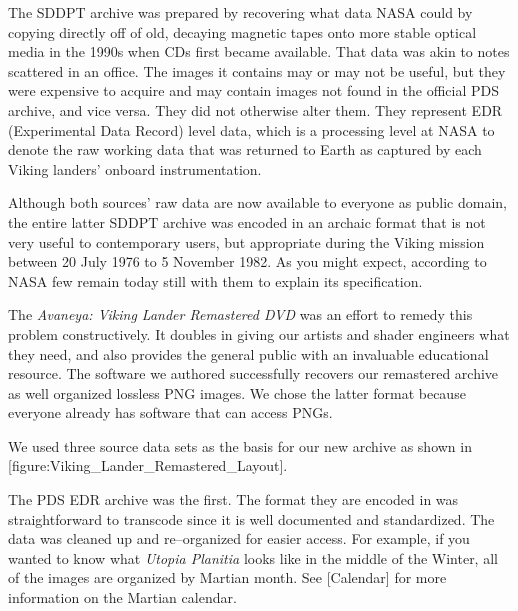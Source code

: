 The SDDPT archive was prepared by recovering what data NASA could by copying directly off of old, decaying magnetic tapes onto more stable optical media in the 1990s when CDs first became available. That data was  akin to notes scattered in an office. The images it contains may or may not be useful, but they were expensive to acquire and may contain images not found in the official PDS archive, and vice versa. They did not otherwise alter them. They represent EDR (Experimental Data Record) level data, which is a processing level at NASA to denote the raw working data that was returned to Earth as captured by each Viking landers' onboard instrumentation.

Although both sources' raw data are now available to everyone as public domain, the entire latter SDDPT archive was encoded in an archaic format that is not very useful to contemporary users, but appropriate during the Viking mission between 20 July 1976 to 5 November 1982. As you might expect, according to NASA few remain today still with them to explain its specification.

The {\it Avaneya: Viking Lander Remastered DVD} was an effort to remedy this problem constructively. It doubles in giving our artists and shader engineers what they need, and also provides the general public with an invaluable educational resource. The software we authored successfully recovers our remastered archive as well organized lossless PNG images. We chose the latter format because everyone already has software that can access PNGs.

We used three source data sets as the basis for our new archive as shown in [figure:Viking_Lander_Remastered_Layout].
\crlf

    {}

The PDS EDR archive was the first. The format they are encoded in was straightforward to transcode since it is well documented and standardized. The data was cleaned up and re--organized for easier access. For example, if you wanted to know what {\it Utopia Planitia} looks like in the middle of the Winter, all of the images are organized by Martian month. See [Calendar] for more information on the Martian calendar.

